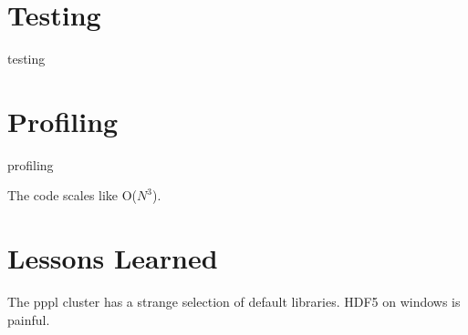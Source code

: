 \documentclass[paper=letter, fontsize=11pt]{scrartcl} %
\begin{document}
\section{Testing}

testing


\section{Profiling}

profiling

The code scales like O($N^3$). 


\section{Lessons Learned}

The pppl cluster has a strange selection of default libraries.
HDF5 on windows is painful.
\end{document}
